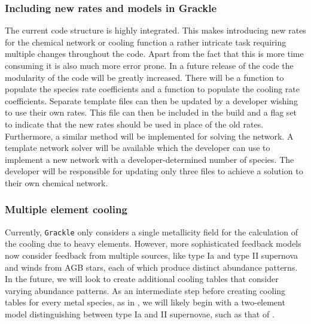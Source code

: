 \subsubsection{Including new rates and models in Grackle}
The current code structure is highly integrated. This makes introducing new rates for the 
chemical network or cooling function a rather intricate task requiring multiple changes throughout the code. 
Apart from the fact that this is more time consuming it is also much more error prone. In a future release of the 
code the modularity of the code will be greatly increased. There will be a function to populate the species 
rate coefficients and a function to populate the cooling rate coefficients. Separate template files can then be 
updated by a developer wishing to use their own rates. This file can then be included in the build and a flag
set to indicate that the new rates should be used in place of the old rates. Furthermore, a similar method will be 
implemented for solving the network. A template network solver will be available which the developer can use to 
implement a new network with a developer-determined number of species. The developer will be responsible for
updating only three files to achieve a solution to their own chemical network. 


\subsubsection{Multiple element cooling}

Currently, \texttt{Grackle} only considers a single metallicity field
for the calculation of the cooling due to heavy elements.  However,
more sophisticated feedback models now consider feedback from multiple
sources, like type Ia and type II supernova and winds from AGB stars,
each of which produce distinct abundance patterns.  In the future, we
will look to create additional cooling tables that consider varying
abundance patterns.  As an intermediate step before creating cooling
tables for every metal species, as in \citet{2009MNRAS.393...99W}, we
will likely begin with a two-element model distinguishing between type
Ia and II supernovae, such as that of \citet{2013MNRAS.433.3005D}.



